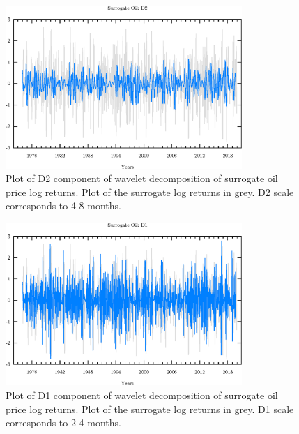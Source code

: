 \begin{figure}
\begin{center}
\includegraphics[width=0.8\textwidth]{./code/plot/surrogate_oil_wr_D2.eps}
\caption{Plot of D2 component of wavelet decomposition of surrogate oil price log returns. 
	Plot of the surrogate log returns in grey. D2 scale corresponds to 4-8 months.}
\end{center}
\label{fig:s-oil-wr-d2}
\end{figure}

\begin{figure}
\begin{center}
\includegraphics[width=0.8\textwidth]{./code/plot/surrogate_oil_wr_D1.eps}
\caption{Plot of D1 component of wavelet decomposition of surrogate oil price log returns. 
	Plot of the surrogate log returns in grey. D1 scale corresponds to 2-4 months.}
\end{center}
\label{fig:s-oil-wr-d1}
\end{figure}
